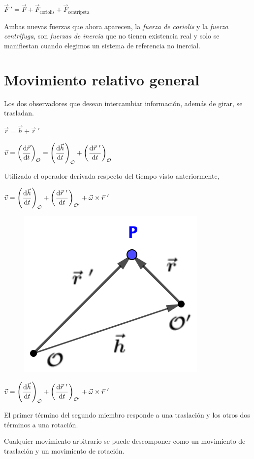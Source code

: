 $\vec F \ '= \vec F + \vec F_{\text{coriolis}}+ \vec F_{\text{centrípeta}}$

\begin{miparrafodestacado}
	 Ambas nuevas fuerzas que ahora aparecen, la \emph{fuerza de coriolis} y la \emph{fuerza centrífuga}, son \emph{fuerzas de inercia} que no tienen existencia real y solo se manifiestan cuando elegimos un sistema de referencia no inercial.
\end{miparrafodestacado}


\section{Movimiento relativo general}

Los dos observadores que desean intercambiar información, además de girar, se trasladan.

\begin{multicols}{2}
$\vec r=\vec h + \vec r\ '$

$\vec v=\displaystyle \left( \dv{\vec r}{t} \right)_{\mathcal O}=
\left( \dv{\vec h}{t} \right)_{\mathcal O} + \left( \dv{\vec r\ '}{t} \right)_{\mathcal O}$

Utilizado el operador derivada respecto del tiempo visto anteriormente,

$\vec v=\displaystyle \left( \dv{\vec h}{t} \right)_{\mathcal O} + \left( \dv{\vec r \ '}{t} \right)_{\mathcal O'}+\vec \omega \times \vec r \ '$

\begin{figure}[H]
	\centering
	\includegraphics[width=.3\textwidth]{imagenes/imagenes10/T10IM04.png}
\end{figure}
\end{multicols}

$\vec v=\displaystyle \left( \dv{\vec h}{t} \right)_{\mathcal O} + \left( \dv{\vec r \ '}{t} \right)_{\mathcal O'}+\vec \omega \times \vec r \ '$

El primer término del segundo miembro responde a una traslación y los otros dos términos a una rotación.

Cualquier movimiento arbitrario se puede descomponer como un movimiento de  traslación y un movimiento de rotación.

